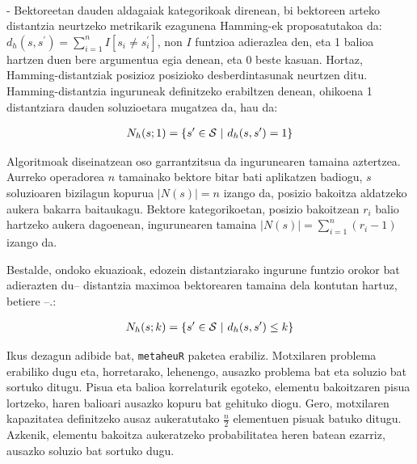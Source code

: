 \documentclass[eu]{ifirak}\usepackage[]{graphicx}\usepackage[]{color}
\newcommand{\code}[1]{\texttt{#1}}
\begin{document}
\paragraph{}
 - Bektoreetan dauden aldagaiak kategorikoak direnean, bi bektoreen arteko distantzia neurtzeko metrikarik ezagunena Hamming-ek proposatutakoa da: $d_h(s,s^\prime) = \sum_{i=1}^n I[s_i\neq s_i^\prime ]$, non $I$ funtzioa adierazlea den, eta 1 balioa hartzen duen bere argumentua egia denean, eta 0 beste kasuan. Hortaz, Hamming-distantziak posizioz posizioko desberdintasunak neurtzen ditu. Hamming-distantzia inguruneak definitzeko erabiltzen denean, ohikoena 1 distantziara dauden soluzioetara mugatzea da, hau da:

\begin{align}\label{eq:hamming1_neigh}
N_{h}(s;1) = \{s^\prime\in {\cal S}\ |\ d_h(s,s^\prime) = 1\}
\end{align}

Algoritmoak diseinatzean oso garrantzitsua da ingurunearen tamaina aztertzea. Aurreko operadorea $n$ tamainako bektore bitar bati aplikatzen badiogu, $s$ soluzioaren bizilagun kopurua $|N(s)| = n$ izango da, posizio bakoitza aldatzeko aukera bakarra baitaukagu. Bektore kategorikoetan, posizio bakoitzean $r_i$ balio hartzeko aukera dagoenean, ingurunearen tamaina $|N(s)| = \sum_{i=1}^n (r_i - 1)$ izango da. 

Bestalde, ondoko ekuazioak, edozein distantziarako ingurune funtzio orokor bat adierazten du-- distantzia maximoa bektorearen tamaina dela kontutan hartuz, betiere  --.:

\begin{align}
N_{h}(s;k) = \{s^\prime\in {\cal S}\ |\ d_h(s,s^\prime) \leq k\}
\end{align}

Ikus dezagun adibide bat, \code{metaheuR} paketea erabiliz. Motxilaren problema erabiliko dugu eta, horretarako, lehenengo, ausazko problema bat eta soluzio bat sortuko ditugu. Pisua eta balioa korrelaturik egoteko, elementu bakoitzaren pisua lortzeko, haren balioari ausazko kopuru bat gehituko diogu. Gero, motxilaren kapazitatea definitzeko ausaz aukeratutako $\frac{n}{2}$ elementuen pisuak batuko ditugu. Azkenik, elementu bakoitza aukeratzeko probabilitatea heren batean ezarriz, ausazko soluzio bat sortuko dugu.
\end{document}
